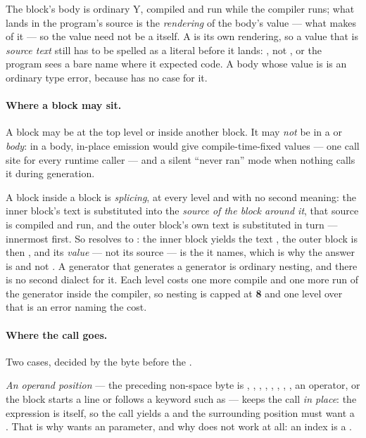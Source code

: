 The block's body is ordinary \textsf{Y}, compiled and run while the compiler
runs; what lands in the program's source is the \emph{rendering} of the body's
value --- what  makes of it --- so the value need not be a 
itself. A  is its own rendering, so a value that is \emph{source text}
still has to be spelled as a literal before it lands: ,
not , or the program sees a bare name where it expected code.
A body whose value is  is an ordinary type error, because 
has no case for it.

\paragraph{Where a block may sit.} A block may be at the top level or inside
another block. It may \emph{not} be in a  or  \emph{body}: in a
body, in-place emission would give compile-time-fixed values --- one call site
for every runtime caller --- and a silent ``never ran'' mode when nothing calls
it during generation.

A block inside a block is \emph{splicing}, at every level and with no second
meaning: the inner block's text is substituted into the \emph{source of the block
around it}, that source is compiled and run, and the outer block's own text is
substituted in turn --- innermost first. So  resolves to : the inner block yields the text , the outer
block is then , and its \emph{value} --- not its source --- is
the  it names, which is why the answer is  and not . A generator that generates a generator is ordinary nesting, and there is no
second dialect for it. Each level costs one more compile and one more run of the
generator inside the compiler, so nesting is capped at \textbf{8} and one level
over that is an error naming the cost.

\paragraph{Where the call goes.} Two cases, decided by the byte before the
\ic{\#\{}.

\emph{An operand position} --- the preceding non-space byte is \ic{(}, \ic{,},
\ic{=}, \ic{[}, \ic{\{}, \ic{;}, \ic{:}, , an operator, or the block starts
a line or follows a keyword such as  --- keeps the call \emph{in
place}: the expression is \ic{\#\{ \ldots \}\#} itself, so the call yields a
 and the surrounding position must want a . That is why
 wants an  parameter, and why
 does not work at all: an index is a .

